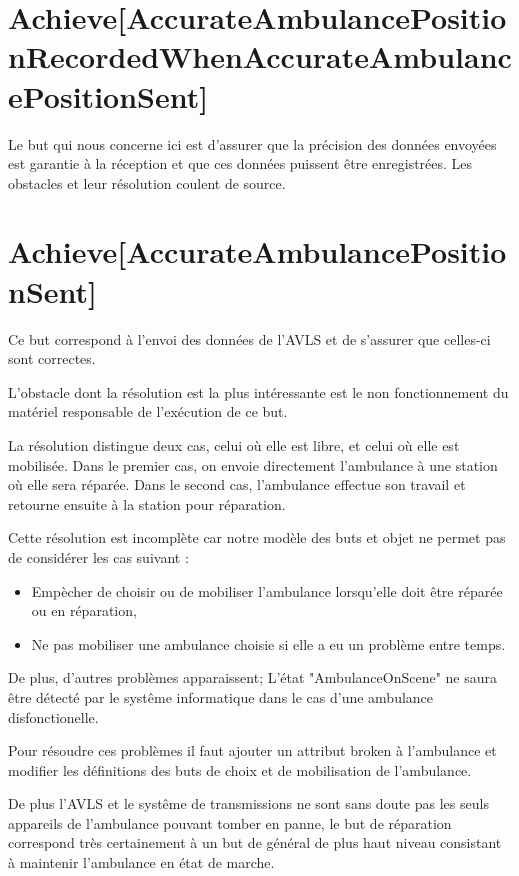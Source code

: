 \section{Achieve[AccurateAmbulancePositionRecordedWhenAccurateAmbulancePositionSent]}
	Le but qui nous concerne ici est d'assurer que la précision des
	données envoyées est garantie à la réception et que ces données
	puissent être enregistrées. Les obstacles et leur résolution coulent 
	de source.

\section{Achieve[AccurateAmbulancePositionSent]}
	Ce but correspond à l'envoi des données de l'AVLS et de s'assurer
	que celles-ci sont correctes. 

	L'obstacle dont la résolution est la plus intéressante est le non
	fonctionnement du matériel responsable de l'exécution de ce but.

	La résolution distingue deux cas, celui où elle est libre, et celui
	où elle est mobilisée. Dans le premier cas, on envoie directement
	l'ambulance à une station où elle sera réparée. Dans le second
	cas, l'ambulance effectue son travail et retourne ensuite à la 
	station pour réparation.

	Cette résolution est incomplète car notre modèle des buts et objet
	ne permet pas de considérer les cas suivant : 
	\begin{itemize}
		\item Empècher de choisir ou de mobiliser l'ambulance lorsqu'elle
		doit être réparée ou en réparation,
		\item Ne pas mobiliser une ambulance choisie si elle a eu un
		problème entre temps.
	\end{itemize}

	De plus, d'autres problèmes apparaissent; L'état "AmbulanceOnScene"
	ne saura être détecté par le systême informatique dans le
	cas d'une ambulance disfonctionelle.

	Pour résoudre ces problèmes il faut ajouter un attribut broken
	à l'ambulance et modifier les définitions des buts de choix et
	de mobilisation de l'ambulance. 

	De plus l'AVLS et le systême de transmissions ne sont sans doute pas
	les seuls appareils de l'ambulance pouvant tomber en panne, le but
	de réparation correspond très certainement à un but de général de
	plus haut niveau consistant à maintenir l'ambulance en état de marche.

